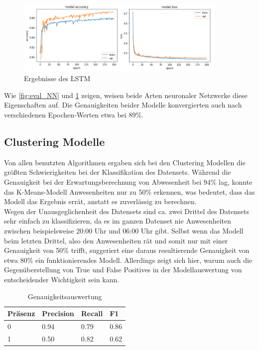 \begin{figure}[h]
    \centering
    \includegraphics[width=0.9\textwidth]{pic/eval_LSTM.png}
    \caption{Ergebnisse des LSTM}
    \label{fig:eval_LSTM}
\end{figure}

Wie \ref{fig:eval_NN} und \ref{fig:eval_LSTM} zeigen, weisen beide Arten neuronaler Netzwerke diese Eigenschaften auf. Die Genauigkeiten beider Modelle
konvergierten auch nach verschiedenen Epochen-Werten etwa bei 89\%.

\subsection{Clustering Modelle}
Von allen benutzten Algorithmen ergaben sich bei den Clustering Modellen die größten Schwierigkeiten bei der 
Klassifikation des Datensets. 
Während die Genauigkeit bei der Erwartungsberechnung von Abwesenheit bei 94\% lag, konnte das
K-Means-Modell Anwesenheiten nur zu 50\% erkennen, was bedeutet, dass das Modell das Ergebnis errät, anstatt
es zuverlässig zu berechnen. \\
Wegen der Unausgeglichenheit des Datensets sind ca. zwei Drittel des Datensets sehr einfach zu 
klassifizieren, da es im ganzen Datenset nie Anwesenheiten zwischen beispielsweise 20:00 Uhr und 06:00 Uhr 
gibt. Selbst wenn das Modell beim letzten Drittel, also den Anwesenheiten rät und somit nur
mit einer Genauigkeit von 50\% trifft, suggeriert eine daraus resultierende Genauigkeit von etwa 80\% ein 
funktionierendes Modell.
Allerdings zeigt sich hier, warum auch die Gegenüberstellung von True und False Positives in der 
Modellauswertung von entscheidender Wichtigkeit sein kann.\\

\begin{center}
    \begin{table}[h]
        \centering
        \caption{Genauigkeitsauswertung}
        \begin{tabular}{|p{1.5cm}||p{1.8cm}|p{1.5cm}|p{1.5cm}|}
            \hline
            \hfill Präsenz&\hfill Precision &\hfill Recall &\hfill F1\\
            \hline
            \hline
            \hfill 0&\hfill 0.94&\hfill 0.79&\hfill 0.86\\
            \hfill 1&\hfill 0.50&\hfill 0.82&\hfill 0.62\\
            \hline
        \end{tabular}          
        \label{tab:clus}
    \end{table}
\end{center}

